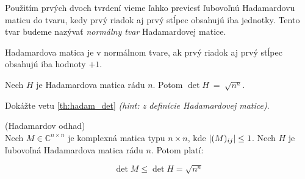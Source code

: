 Použitím prvých dvoch tvrdení vieme ľahko previesť ľubovoľnú Hadamardovu maticu do tvaru, kedy prvý riadok aj prvý stĺpec obsahujú iba jednotky. Tento tvar budeme nazývať \emph{normálny tvar} Hadamardovej matice.

\begin{definition}
Hadamardova matica je v normálnom tvare, ak prvý riadok aj prvý stĺpec obsahujú iba hodnoty $+1$.
\end{definition}

\begin{theorem}
\label{th:hadam_det}
Nech $H$ je Hadamardova matica rádu $n$. Potom $\det{H}~=~\sqrt{n^n}$.
\end{theorem}

\begin{exercise}
Dokážte vetu \ref{th:hadam_det} \emph{(hint: z definície Hadamardovej matice)}.
\end{exercise}

\begin{theorem_hard}{(Hadamardov odhad)}\\
Nech $M \in \mathbb{C}^{n\times n}$ je komplexná matica typu $n\times n$, kde $\left|(M)_{ij}\right| \leq 1$. 
Nech $H$ je ľubovoľná Hadamardova matica rádu $n$.
Potom platí:

$$\det{M} \leq \det{H} = \sqrt{n^n}$$

\end{theorem_hard}

